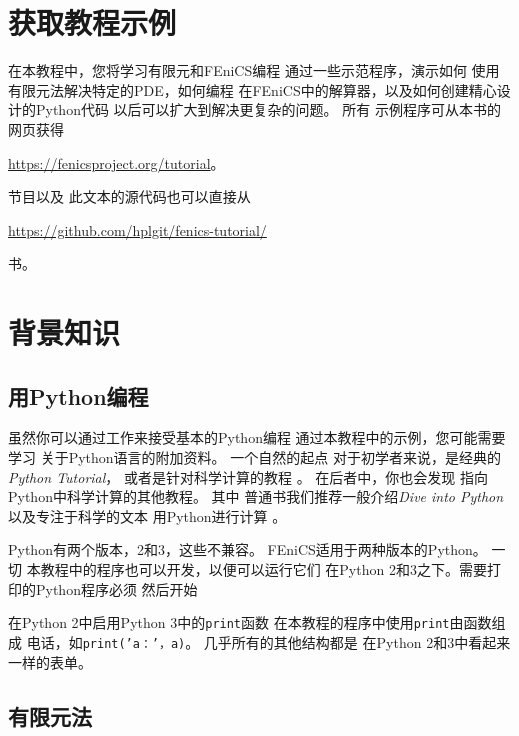 \section{获取教程示例}
在本教程中，您将学习有限元和FEniCS编程
通过一些示范程序，演示如何
使用有限元法解决特定的PDE，如何编程
在FEniCS中的解算器，以及如何创建精心设计的Python代码
以后可以扩大到解决更复杂的问题。 所有
示例程序可从本书的网页获得
\begin{center}
  \url{https://fenicsproject.org/tutorial}。
\end{center}
  节目以及
此文本的源代码也可以直接从
\begin{center}
\url{https://github.com/hplgit/fenics-tutorial/}
\end{center}
书。


\section{背景知识}
\subsection{用Python编程}
\label{ftut:pybooks}

虽然你可以通过工作来接受基本的Python编程
通过本教程中的示例，您可能需要学习
关于Python语言的附加资料。 一个自然的起点
对于初学者来说，是经典的\emph{Python Tutorial}\cite{PythonTutorial}，
或者是针对科学计算的教程
\cite{Langtangen_Hellevik_tutorial}。 在后者中，你也会发现
指向Python中科学计算的其他教程。 其中
普通书我们推荐一般介绍\emph{Dive into
Python}\cite{Pilgrim}以及专注于科学的文本
用Python进行计算
\cite{Langtangen2008,Langtangen2009a,Kinder_Nelson_2015,Kiusalaas2005,Landau_2015}。

\begin{notice}[Python版本]
Python有两个版本，2和3，这些不兼容。
FEniCS适用于两种版本的Python。 一切
本教程中的程序也可以开发，以便可以运行它们
在Python 2和3之下。需要打印的Python程序必须
然后开始
在Python 2中启用Python 3中的\texttt{print}函数
在本教程的程序中使用\texttt{print}由函数组成
电话，如\texttt{print('a：'，a)}。 几乎所有的其他结构都是
在Python 2和3中看起来一样的表单。
\end{notice}

\subsection{有限元法}
\label{ftut:fembooks}

